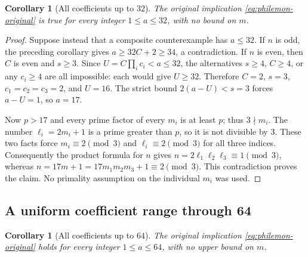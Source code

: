\documentclass[11pt,a4paper]{article}
\newtheorem{corollary}[theorem]{Corollary}
\theoremstyle{definition}\newtheorem{definition}[theorem]{Definition}
\theoremstyle{remark}\newtheorem{remark}[theorem]{Remark}
\begin{document}
\begin{corollary}[All coefficients up to $32$]
\label{cor:philemon-small-coefficient}
The original implication \eqref{eq:philemon-original} is true for
every integer $1\leq a\leq32$, with no bound on $m$.
\end{corollary}

\begin{proof}
Suppose instead that a composite counterexample has $a\leq32$.
If $n$ is odd, the preceding corollary gives
$a\geq32C+2\geq34$, a contradiction.
If $n$ is even, then $C$ is even and $s\geq3$.  Since
$U=C\prod_i c_i<a\leq32$, the alternatives $s\geq4$, $C\geq4$,
or any $c_i\geq4$ are all impossible: each would give $U\geq32$.
Therefore $C=2$, $s=3$, $c_1=c_2=c_3=2$, and $U=16$.
The strict bound $2(a-U)<s=3$ forces $a-U=1$, so $a=17$.

Now $p>17$ and every prime factor of every $m_i$ is at least $p$;
thus $3\nmid m_i$.  The number $\ell_i=2m_i+1$ is a prime greater
than $p$, so it is not divisible by $3$.  These two facts force
$m_i\equiv2\pmod3$ and $\ell_i\equiv2\pmod3$ for all three
indices.  Consequently the product formula for $n$ gives
$n=2\ell_1\ell_2\ell_3\equiv1\pmod3$, whereas
$n=17m+1=17m_1m_2m_3+1\equiv2\pmod3$.
This contradiction proves the claim.  No primality assumption on
the individual $m_i$ was used.
\end{proof}

%


\subsection{A uniform coefficient range through 64}
\label{sec:philemon-64}

\begin{corollary}[All coefficients up to $64$]
\label{cor:philemon-coeff64}
The original implication \eqref{eq:philemon-original} holds for every
integer $1\leq a\leq64$, with no upper bound on $m$.
\end{corollary}
\end{document}
